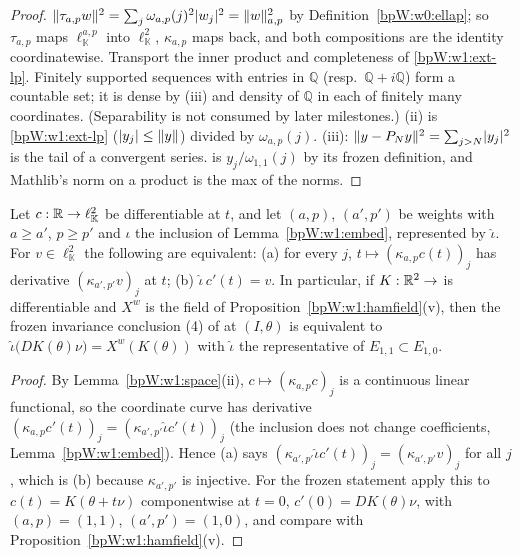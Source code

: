 \begin{proof}
\label{stepW:w1:iso}
$\lVert \tau_{a,p}w\rVert^2=\sum_j\omega_{a,p}(j)^2\lvert w_j\rvert^2=\lVert w\rVert_{a,p}^2$ by Definition~\ref{bpW:w0:ellap}; so
$\tau_{a,p}$ maps $\ell^{a,p}_{\mathbb K}$ into $\ell^2_{\mathbb K}$, $\kappa_{a,p}$ maps back, and both
compositions are the identity coordinatewise. Transport the inner product and completeness of
\ref{bpW:w1:ext-lp}.
\label{stepW:w1:sep}
Finitely supported sequences with entries in $\mathbb Q$ (resp.\ $\mathbb Q+i\mathbb Q$) form a countable set; it is
dense by (iii) and density of $\mathbb Q$ in each of finitely many coordinates. (Separability is not consumed by later
milestones.)
\label{stepW:w1:coord}
(ii) is \ref{bpW:w1:ext-lp} ($\lvert y_j\rvert\le\lVert y\rVert$) divided by $\omega_{a,p}(j)$. (iii):
$\lVert y-P_Ny\rVert^2=\sum_{j>N}\lvert y_j\rvert^2$ is the tail of a convergent series.
\label{stepW:w1:frozen}
 is $y_j/\omega_{1,1}(j)$ by its frozen definition, and Mathlib's norm on a product is the max of the
norms.
\end{proof}

\begin{lemma}\label{bpW:w1:coordinatewise}
Let $c:\mathbb{R}\to\ell^2_{\mathbb K}$ be differentiable at $t$, and let $(a,p)$, $(a',p')$ be weights with $a\ge a'$,
$p\ge p'$ and $\iota$ the inclusion of Lemma~\ref{bpW:w1:embed}, represented by $\hat\iota$. For $v\in\ell^2_{\mathbb K}$
the following are equivalent:
(a) for every $j$, $t\mapsto(\kappa_{a,p}c(t))_j$ has derivative $(\kappa_{a',p'}v)_j$ at $t$;
(b) $\hat\iota\,c'(t)=v$.
In particular, if $K:\mathbb{R}^2\to$  is differentiable and $X^w$ is the field of
Proposition~\ref{bpW:w1:hamfield}(v), then the frozen invariance conclusion (4) of  at $(I,\theta)$
is equivalent to $\hat\iota\bigl(DK(\theta)\nu\bigr)=X^w(K(\theta))$ with $\hat\iota$ the representative of
$E_{1,1}\subset E_{1,0}$.
\end{lemma}

\begin{proof}
\label{stepW:w1:coordder}
By Lemma~\ref{bpW:w1:space}(ii), $c\mapsto(\kappa_{a,p}c)_j$ is a continuous linear functional, so the coordinate curve
has derivative $(\kappa_{a,p}c'(t))_j=(\kappa_{a',p'}\hat\iota c'(t))_j$ (the inclusion does not change coefficients,
Lemma~\ref{bpW:w1:embed}).
\label{stepW:w1:coordcomp}
Hence (a) says $(\kappa_{a',p'}\hat\iota c'(t))_j=(\kappa_{a',p'}v)_j$ for all $j$, which is (b) because
$\kappa_{a',p'}$ is injective. For the frozen statement apply this to $c(t)=K(\theta+t\nu)$ componentwise at $t=0$,
$c'(0)=DK(\theta)\nu$, with $(a,p)=(1,1)$, $(a',p')=(1,0)$, and compare with
Proposition~\ref{bpW:w1:hamfield}(v).
\end{proof}

